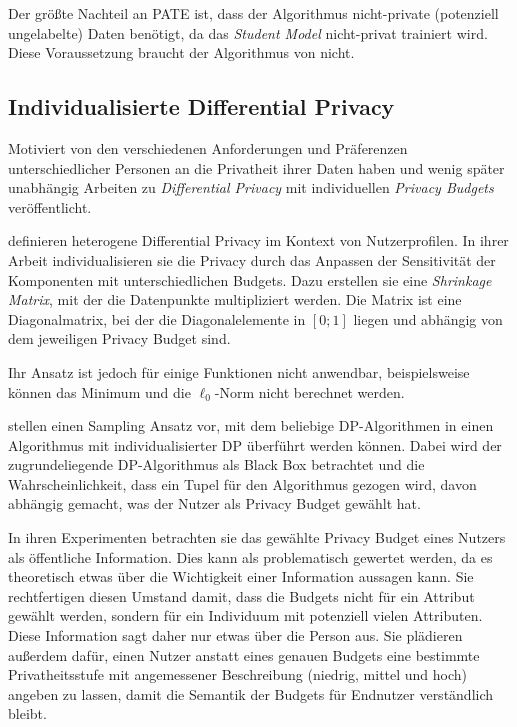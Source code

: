 Der größte Nachteil an PATE ist, dass der Algorithmus nicht-private (potenziell ungelabelte) Daten benötigt, da das \textit{Student Model} nicht-privat trainiert wird. Diese Voraussetzung braucht der Algorithmus von \textcite{abadi:2016} nicht.

\subsection{Individualisierte Differential Privacy}\label{fund-idp}

Motiviert von den verschiedenen Anforderungen und Präferenzen unterschiedlicher Personen an die Privatheit ihrer Daten haben \textcite{alaggan:2016} und wenig später unabhängig \textcite{jorgensen:2015} Arbeiten zu \textit{Differential Privacy} mit individuellen \textit{Privacy Budgets} veröffentlicht.

\textcite{alaggan:2016} definieren heterogene Differential Privacy im Kontext von Nutzerprofilen. In ihrer Arbeit individualisieren sie die Privacy durch das Anpassen der Sensitivität der Komponenten mit unterschiedlichen Budgets. Dazu erstellen sie eine \textit{Shrinkage Matrix}, mit der die Datenpunkte multipliziert werden. Die Matrix ist eine Diagonalmatrix, bei der die Diagonalelemente in $[0;1]$ liegen und abhängig von dem jeweiligen Privacy Budget sind.

Ihr Ansatz ist jedoch für einige Funktionen nicht anwendbar, beispielsweise können das Minimum und die $\ell_0$-Norm nicht berechnet werden.

\textcite{jorgensen:2015} stellen einen Sampling Ansatz vor, mit dem beliebige DP-Algorithmen in einen Algorithmus mit individualisierter DP überführt werden können. Dabei wird der zugrundeliegende DP-Algorithmus als Black Box betrachtet und die Wahrscheinlichkeit, dass ein Tupel für den Algorithmus gezogen wird, davon abhängig gemacht, was der Nutzer als Privacy Budget gewählt hat.

In ihren Experimenten betrachten sie das gewählte Privacy Budget eines Nutzers als öffentliche Information. Dies kann als problematisch gewertet werden, da es theoretisch etwas über die Wichtigkeit einer Information aussagen kann. Sie rechtfertigen diesen Umstand damit, dass die Budgets nicht für ein Attribut gewählt werden, sondern für ein Individuum mit potenziell vielen Attributen. Diese Information sagt daher nur etwas über die Person aus. Sie plädieren außerdem dafür, einen Nutzer anstatt eines genauen Budgets eine bestimmte Privatheitsstufe mit angemessener Beschreibung (niedrig, mittel und hoch) angeben zu lassen, damit die Semantik der Budgets für Endnutzer verständlich bleibt.

